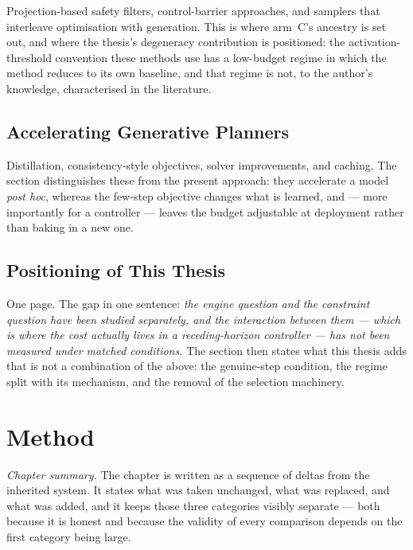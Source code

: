 \documentclass[headsepline,footsepline,footinclude=false,oneside,fontsize=11pt,paper=a4,listof=totoc,bibliography=totoc]{scrbook}
\begin{document}
Projection-based safety filters, control-barrier approaches, and samplers that interleave
optimisation with generation. This is where arm~C's ancestry is set out, and where the
thesis's degeneracy contribution is positioned: the activation-threshold convention these
methods use has a low-budget regime in which the method reduces to its own baseline, and
that regime is not, to the author's knowledge, characterised in the literature.

\section{Accelerating Generative Planners}\label{sec:rel:accel}

Distillation, consistency-style objectives, solver improvements, and caching. The section
distinguishes these from the present approach: they accelerate a model \emph{post hoc},
whereas the few-step objective changes what is learned, and --- more importantly for a
controller --- leaves the budget adjustable at deployment rather than baking in a new one.

\section{Positioning of This Thesis}\label{sec:rel:positioning}

One page. The gap in one sentence: \emph{the engine question and the constraint question have
been studied separately, and the interaction between them --- which is where the cost
actually lives in a receding-horizon controller --- has not been measured under matched
conditions.} The section then states what this thesis adds that is not a combination of the
above: the genuine-step condition, the regime split with its mechanism, and the removal of
the selection machinery.

\chapter{Method}\label{ch:method}

\emph{Chapter summary.} The chapter is written as a sequence of deltas from the inherited
system. It states what was taken unchanged, what was replaced, and what was added, and it
keeps those three categories visibly separate --- both because it is honest and because the
validity of every comparison depends on the first category being large.
\end{document}
